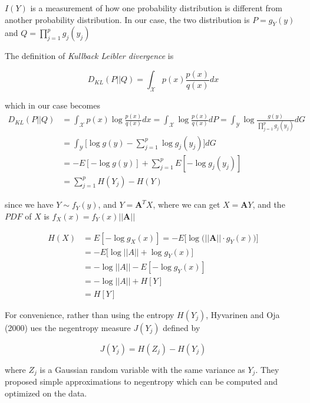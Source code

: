 \documentclass{article}
\begin{document}
\begin{tcolorbox}[title=\textit{Kullback  Leibler} Divergence, coltitle = blue!50!black, colframe = blue!25]
	$I(Y)$ is a measurement of how one probability distribution is different from another probability distribution. In our case, the two distribution is $P = g_Y(y)$ and $Q = \prod_{j=1}^p g_j(y_j)$
	
	The definition of \textit{Kullback  Leibler divergence} is

	\begin{equation}
		D_{KL}(P||Q) = \int_{\mathcal X} p(x) \frac{p(x)}{q(x)} dx
	\end{equation}
	
	which in our case becomes
	\begin{align}
		D_{KL}(P||Q) &= \int_{\mathcal X} p(x) \log \frac{p(x)}{q(x)} dx
		 = \int_{\mathcal X} \log \frac{p(x)}{q(x)} dP
		  = \int_{\mathcal Y} \log \frac{g(y)}{\prod_{j=1}^p g_j(y_j)} dG\\
		& = \int_{\mathcal Y} \bigg[ \log g(y) - \sum_{j=1}^p \log g_j(y_j) \bigg] dG\\
		 &= -E[-\log g(y)] + \sum_{j=1}^p E[-\log g_j(y_j)]\\
		 & = \sum_{j=1}^p H(Y_j) - H(Y)
	\end{align}
	
\end{tcolorbox}


since we have $Y \sim f_Y(y)$, and $Y = \pmb A^T X$, where we can get $X = \pmb A Y$, and the $PDF$ of $X$ is $f_X(x) = f_Y(x)||\pmb A||$

\begin{align}
	H(X) & = E[-\log g_X(x)] = -E\bigg[ \log \big(||\pmb A|| \cdot g_Y(x)\big) \bigg]\\
	& = - E\bigg[ \log ||A|| + \log g_Y(x) \bigg] \\
	& = -\log||A|| - E[-\log g_Y(x)]\\
	& = -\log||A|| + H[Y]\\
	& = H[Y]
\end{align}



For convenience, rather than using the entropy $H(Y_j)$, Hyvarinen and Oja (2000) ues the negentropy measure $J(Y_j)$ defined by
\vspace{1.8mm}

\begin{equation}
	J(Y_j) = H(Z_j) - H(Y_j)
\end{equation}

where $Z_j$ is a Gaussian random variable with the same variance as $Y_j$. They proposed simple approximations to negentropy which can be computed and optimized on the data.
\end{document}
